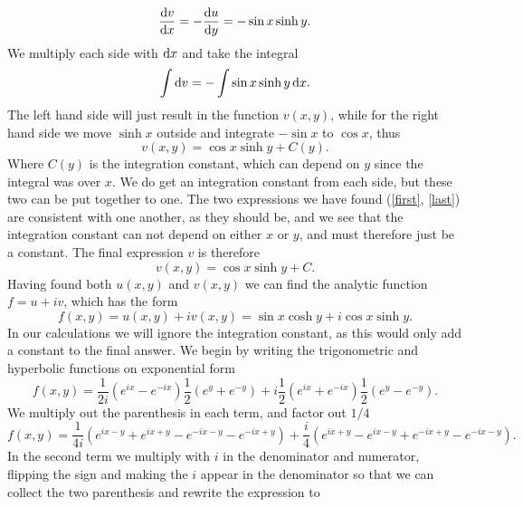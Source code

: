 \documentclass[12pt,twoside]{article}
\begin{document}
\begin{equation}
  \dv{v}{x} = -\dv{u}{y} = - \sin{x}\sinh{y}.
\end{equation}
We multiply each side with $\dif x$ and take the integral
\begin{equation}
  \int \dif v = - \int \sin{x}\sinh{y} \dif x.
\end{equation}
The left hand side will just result in the function $v(x, y)$, while for the right hand side we move $\sinh{x}$ outside and integrate $-\sin{x}$ to $\cos{x}$, thus
\begin{equation}
  v(x, y) = \cos{x}\sinh{y} + C(y). \label{last}
\end{equation}
Where $C(y)$ is the integration constant, which can depend on $y$ since the integral was over $x$.  We do get an integration constant from each side, but these two can be put together to one. The two expressions we have found (\ref{first}, \ref{last}) are consistent with one another, as they should be, and we see that the integration constant can not depend on either $x$ or $y$, and must therefore just be a constant. The final expression $v$ is therefore
\begin{equation}
  v(x, y) = \cos{x}\sinh{y} + C. \label{v}
\end{equation}
Having found both $u(x,y)$ and $v(x,y)$ we can find the analytic function $f=u+iv$, which has the form
\begin{equation}
  f(x, y) = u(x, y) + iv(x, y) = \sin{x}\cosh{y} + i\cos{x}\sinh{y}.
\end{equation}
In our calculations we will ignore the integration constant, as this would only add a constant to the final answer. We begin by writing the trigonometric and hyperbolic functions on exponential form
\begin{equation}
  f(x, y) = \frac{1}{2i}\left(e^{ix}-e^{-ix}\right)\frac{1}{2}\left(e^{y}+e^{-y}\right) + i\frac{1}{2}\left(e^{ix}+e^{-ix}\right)\frac{1}{2}\left(e^{y}-e^{-y}\right).
\end{equation}
We multiply out the parenthesis in each term, and factor out $1/4$
\begin{equation}
  f(x, y) = \frac{1}{4i}\left(e^{ix-y}+e^{ix+y}-e^{-ix-y}-e^{-ix+y}\right) + \frac{i}{4}\left(e^{ix+y}-e^{ix-y}+e^{-ix+y}-e^{-ix-y}\right).
\end{equation}
In the second term we multiply with $i$ in the denominator and numerator, flipping the sign and making the $i$ appear in the denominator so that we can collect the two parenthesis and rewrite the expression to
\end{document}
